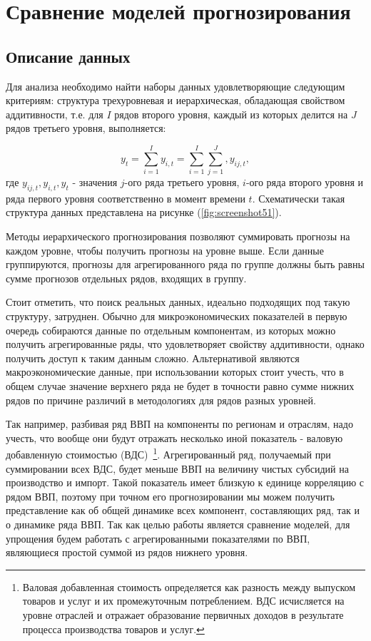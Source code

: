 \documentclass[12pt,a4paper, oneside]{extreport}
\begin{document}
\chapter{Сравнение моделей прогнозирования}





\section{Описание данных}

Для анализа  необходимо найти наборы данных удовлетворяющие следующим критериям: 
структура трехуровневая и иерархическая, обладающая свойством аддитивности, т.е. для $I$ рядов второго уровня, каждый из которых делится на $J$ рядов третьего уровня, выполняется: 

\begin{equation}\label{key}
y_t = \sum_{i=1}^I y_{i,t} = \sum_{i=1}^I \sum_{j=1}^J, y_{ij,t} ,
\end{equation}
\noindent
где $y_{ij,t}, y_{i,t},  y_{t}  $ - значения $j$-ого ряда третьего уровня, $i$-ого ряда второго уровня и ряда первого уровня соответственно в момент времени $t$. Схематически такая  структура данных представлена на рисунке (\ref{fig:screenshot51}).

Методы иерархического прогнозирования позволяют суммировать прогнозы на каждом уровне, чтобы получить  прогнозы на уровне выше. Если  данные группируются, прогнозы для агрегированного  ряда по   группе должны быть равны сумме прогнозов отдельных рядов, входящих в группу.

Стоит отметить, что поиск реальных данных, идеально подходящих под такую структуру, затруднен. Обычно для микроэкономических показателей  в первую очередь собираются данные по отдельным компонентам, из которых  можно получить агрегированные ряды, что удовлетворяет свойству аддитивности, однако получить доступ к таким данным сложно. Альтернативой являются макроэкономические данные, при использовании которых стоит учесть, что в общем случае значение верхнего ряда не будет в точности  равно сумме нижних рядов по причине различий в методологиях для рядов разных уровней.

Так например, разбивая ряд ВВП на компоненты по регионам и отраслям, надо учесть, что вообще они будут отражать несколько иной показатель -  валовую добавленную стоимостью (ВДС)~\footnote{Валовая добавленная стоимость определяется как разность между выпуском товаров и услуг и их промежуточным потреблением. ВДС  исчисляется на уровне отраслей и отражает образование первичных доходов в результате процесса производства товаров и услуг.}. Агрегированный ряд, получаемый при суммировании всех ВДС, будет меньше ВВП на величину чистых субсидий на производство и импорт. Такой показатель имеет близкую к единице корреляцию с рядом ВВП, поэтому при точном его прогнозировании мы можем получить представление как об общей динамике всех компонент, составляющих ряд, так и о динамике ряда ВВП.  Так как целью работы является сравнение моделей, для упрощения будем работать с агрегированными показателями по ВВП, являющиеся простой суммой из рядов нижнего уровня. 
\end{document}
